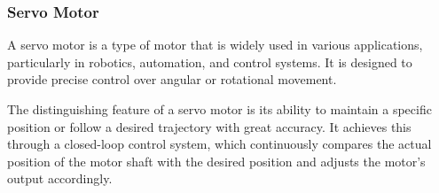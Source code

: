 \documentclass[english]{article}
\begin{document}
\subsubsection{Servo Motor}
A servo motor is a type of motor that is widely used in various 
applications, particularly in robotics, automation, and control systems.
It is designed to provide precise control over angular or rotational
movement. \newline

The distinguishing feature of a servo motor is its ability to maintain
 a specific position or follow a desired trajectory with great accuracy.
It achieves this through a closed-loop control system, which continuously
compares the actual position of the motor shaft with the desired position
and adjusts the motor's output accordingly. 
\end{document}
